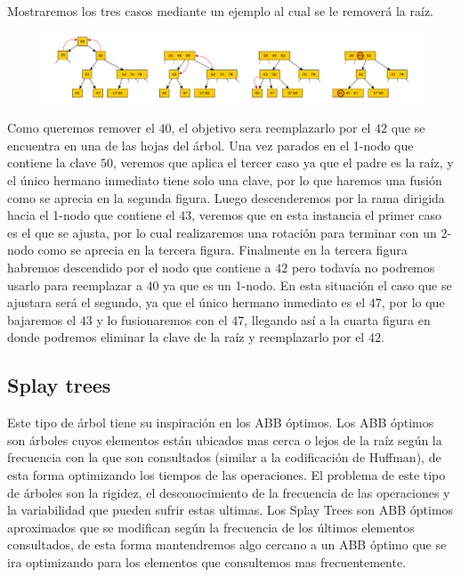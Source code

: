 \documentclass[10pt, a4paper]{report}
\begin{document}
Mostraremos los tres casos mediante un ejemplo al cual se le remover\'a la ra\'iz.

\begin{figure}
 \centering
 \includegraphics[width=1\textwidth]{EliminacionArboles234.pdf}
\end{figure}

Como queremos remover el $40$, el objetivo sera reemplazarlo por el $42$ que se encuentra en una de las hojas del \'arbol. Una vez parados en el 1-nodo que contiene la clave $50$, veremos que aplica el tercer caso ya que el padre es la ra\'iz, y el \'unico hermano inmediato tiene solo una clave, por lo que haremos una fusi\'on como se aprecia en la segunda figura. Luego descenderemos por la rama dirigida hacia el 1-nodo que contiene el $43$, veremos que en esta instancia el primer caso es el que se ajusta, por lo cual realizaremos una rotaci\'on para terminar con un 2-nodo como se aprecia en la tercera figura. Finalmente en la tercera figura habremos descendido por el nodo que contiene a $42$ pero todav\'ia no podremos usarlo para reemplazar a $40$ ya que es un 1-nodo. En esta situaci\'on el caso que se ajustara ser\'a el segundo, ya que el \'unico hermano inmediato es el $47$, por lo que bajaremos el $43$ y lo fusionaremos con el $47$, llegando as\'i a la cuarta figura en donde podremos eliminar la clave de 
la ra\'iz y 
reemplazarlo por el $42$.

\subsection{Splay trees}

Este tipo de \'arbol tiene su inspiraci\'on en los ABB \'optimos. Los ABB \'optimos son \'arboles cuyos elementos est\'an ubicados mas cerca o lejos de la ra\'iz seg\'un la frecuencia con la que son consultados (similar a la codificaci\'on de Huffman), de esta forma optimizando los tiempos de las operaciones. El problema de este tipo de \'arboles son la rigidez, el desconocimiento de la frecuencia de las operaciones y la variabilidad que pueden sufrir estas ultimas. Los Splay Trees son ABB \'optimos aproximados que se modifican seg\'un la frecuencia de los \'ultimos elementos consultados, de esta forma mantendremos algo cercano a un ABB \'optimo que se ira optimizando para los elementos que consultemos mas frecuentemente.
\end{document}
